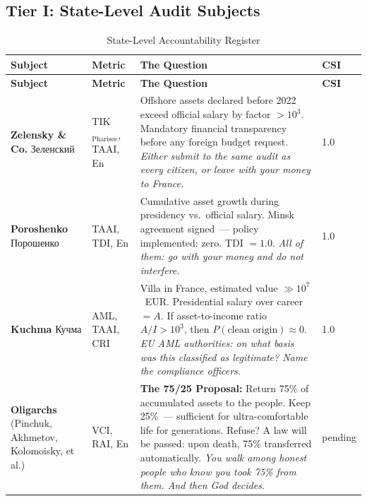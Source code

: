 \documentclass[11pt,a4paper]{article}
\theoremstyle{definition}
\theoremstyle{remark}
\begin{document}
\vspace{0.3cm}

\subsection{Tier I: State-Level Audit Subjects}
\label{sec:list-tier1}

\begin{longtable}{@{}p{}p{}
  p{}p{}@{}}
\caption{State-Level Accountability Register}
\label{tab:list-tier1}\\
\toprule
\textbf{Subject} &
\textbf{Metric} &
\textbf{The Question} &
\textbf{CSI} \\
\midrule
\endfirsthead
\toprule
\textbf{Subject} &
\textbf{Metric} &
\textbf{The Question} &
\textbf{CSI} \\
\midrule
\endhead
\bottomrule
\endlastfoot

\textbf{Zelensky \& Co.}
\newline\foreignlanguage{russian}{Зеленский}
& TIK$_\text{Pharisee}$, TAAI, En
& Offshore assets declared before 2022 exceed official salary
  by factor $> 10^3$.
  Mandatory financial transparency before any foreign budget request.
  \textit{Either submit to the same audit as every citizen,
  or leave with your money to France.} &
  1.0 \\[6pt]

\textbf{Poroshenko}
\newline\foreignlanguage{russian}{Порошенко}
& TAAI, TDI, En
& Cumulative asset growth during presidency vs.\ official salary.
  Minsk agreement signed~--- policy implemented: zero.
  TDI $= 1.0$.
  \textit{All of them: go with your money and
  do not interfere.} &
  1.0 \\[6pt]

\textbf{Kuchma}
\newline\foreignlanguage{russian}{Кучма}
& AML, TAAI, CRI
& Villa in France, estimated value $\gg 10^7$~EUR.
  Presidential salary over career $= A$.
  If asset-to-income ratio $A / I > 10^3$,
  then $P(\text{clean origin}) \approx 0$.
  \textit{EU AML authorities: on what basis
  was this classified as legitimate?
  Name the compliance officers.} &
  1.0 \\[6pt]

\textbf{Oligarchs}
\newline\small(Pinchuk, Akhmetov,
Kolomoisky, et al.)
& VCI, RAI, En
& \textbf{The 75/25 Proposal:}
  Return 75\% of accumulated assets to the people.
  Keep 25\%~--- sufficient for ultra-comfortable life
  for generations.
  Refuse? A law will be passed: upon death,
  75\% transferred automatically.
  \textit{You walk among honest people who know
  you took 75\% from them.
  And then God decides.} &
  pending \\[6pt]


\end{longtable}
\end{document}
